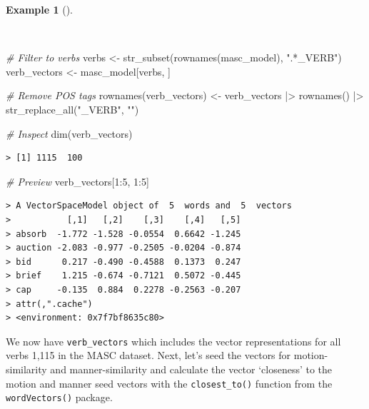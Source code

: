 \documentclass[
  letterpaper,
  DIV=11,
  numbers=noendperiod]{scrreprt}
\newenvironment{Shaded}{\begin{snugshade}}{\end{snugshade}}
\newcommand{\CommentTok}[1]{\textcolor[rgb]{0.00,0.00,0.00}{\textit{#1}}}
\newcommand{\DecValTok}[1]{\textcolor[rgb]{0.00,0.00,0.00}{#1}}
\newcommand{\FunctionTok}[1]{\textcolor[rgb]{0.00,0.00,0.00}{#1}}
\newcommand{\NormalTok}[1]{\textcolor[rgb]{0.00,0.00,0.00}{#1}}
\newcommand{\OtherTok}[1]{\textcolor[rgb]{0.00,0.00,0.00}{#1}}
\newcommand{\SpecialCharTok}[1]{\textcolor[rgb]{0.00,0.00,0.00}{#1}}
\newcommand{\StringTok}[1]{\textcolor[rgb]{0.00,0.00,0.00}{#1}}
\theoremstyle{definition}
\newtheorem{example}{Example}[chapter]
\theoremstyle{remark}
\begin{document}
\begin{example}[]\protect\hypertarget{exm-eda-masc-vsm-word2vec-verbs}{}\label{exm-eda-masc-vsm-word2vec-verbs}

~

\begin{Shaded}
\begin{Highlighting}[]
\CommentTok{\# Filter to verbs}
\NormalTok{verbs }\OtherTok{\textless{}{-}} \FunctionTok{str\_subset}\NormalTok{(}\FunctionTok{rownames}\NormalTok{(masc\_model), }\StringTok{".*\_VERB"}\NormalTok{)}
\NormalTok{verb\_vectors }\OtherTok{\textless{}{-}}\NormalTok{ masc\_model[verbs, ]}

\CommentTok{\# Remove POS tags}
\FunctionTok{rownames}\NormalTok{(verb\_vectors) }\OtherTok{\textless{}{-}}
\NormalTok{  verb\_vectors }\SpecialCharTok{|\textgreater{}}
  \FunctionTok{rownames}\NormalTok{() }\SpecialCharTok{|\textgreater{}}
  \FunctionTok{str\_replace\_all}\NormalTok{(}\StringTok{"\_VERB"}\NormalTok{, }\StringTok{""}\NormalTok{)}

\CommentTok{\# Inspect}
\FunctionTok{dim}\NormalTok{(verb\_vectors)}
\end{Highlighting}
\end{Shaded}

\begin{verbatim}
> [1] 1115  100
\end{verbatim}

\begin{Shaded}
\begin{Highlighting}[]
\CommentTok{\# Preview}
\NormalTok{verb\_vectors[}\DecValTok{1}\SpecialCharTok{:}\DecValTok{5}\NormalTok{, }\DecValTok{1}\SpecialCharTok{:}\DecValTok{5}\NormalTok{]}
\end{Highlighting}
\end{Shaded}

\begin{verbatim}
> A VectorSpaceModel object of  5  words and  5  vectors
>           [,1]   [,2]    [,3]    [,4]   [,5]
> absorb  -1.772 -1.528 -0.0554  0.6642 -1.245
> auction -2.083 -0.977 -0.2505 -0.0204 -0.874
> bid      0.217 -0.490 -0.4588  0.1373  0.247
> brief    1.215 -0.674 -0.7121  0.5072 -0.445
> cap     -0.135  0.884  0.2278 -0.2563 -0.207
> attr(,".cache")
> <environment: 0x7f7bf8635c80>
\end{verbatim}

\end{example}

We now have \texttt{verb\_vectors} which includes the vector
representations for all verbs 1,115 in the MASC dataset. Next, let's
seed the vectors for motion-similarity and manner-similarity and
calculate the vector `closeness' to the motion and manner seed vectors
with the \texttt{closest\_to()} function from the \texttt{wordVectors()}
package.
\end{document}
